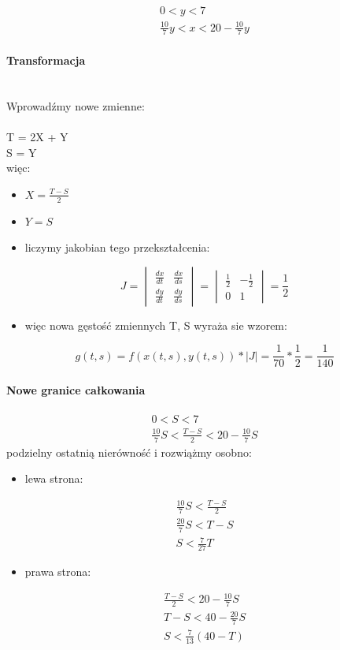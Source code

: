 \documentclass[12pt,a4paper]{article}
\begin{document}
\begin{gather*}
0 < y < 7 \\
\frac{10}{7}y  < x < 20 - \frac{10}{7}y
\end{gather*}

\paragraph*{Transformacja} \mbox{}\\
Wprowadźmy nowe zmienne:\\
\\
T = 2X + Y \\ 
S = Y\\
więc:
\begin{itemize}
    \item $X = \frac{T - S}{2}$
    \item $Y = S$
    \item liczymy jakobian tego przekształcenia:
\end{itemize}
$$ J = 
\begin{vmatrix}
    \frac{dx}{dt} & \frac{dx}{ds} \\
    \frac{dy}{dt} & \frac{dy}{ds}
\end{vmatrix} = 
\begin{vmatrix}
    \frac{1}{2} & -\frac{1}{2} \\
    0 & 1
\end{vmatrix}
= \frac{1}{2}
$$
\begin{itemize}
    \item więc nowa gęstość zmiennych T, S wyraża sie wzorem:
\end{itemize}
$$
g(t, s) = f(x(t, s), y(t, s)) * |J| = \frac{1}{70} * \frac{1}{2} = \frac{1}{140}
$$

\paragraph*{Nowe granice całkowania}
\begin{gather*}
0 < S < 7 \\ 
\frac{10}{7}S < \frac{T - S}{2} < 20 - \frac{10}{7}S
\end{gather*}
podzielny ostatnią nierówność i rozwiążmy osobno:
\begin{itemize}
    \item lewa strona:
\end{itemize}
\begin{gather*}
\frac{10}{7}S < \frac{T - S}{2} \\
\frac{20}{7}S < T - S \\ 
S < \frac{7}{27}T
\end{gather*}
\begin{itemize}
    \item prawa strona:
\end{itemize}
\begin{gather*}
\frac{T - S}{2} < 20 - \frac{10}{7}S \\ 
T - S < 40 - \frac{20}{7}S \\ 
S < \frac{7}{13}(40 - T)
\end{gather*}
\end{document}
